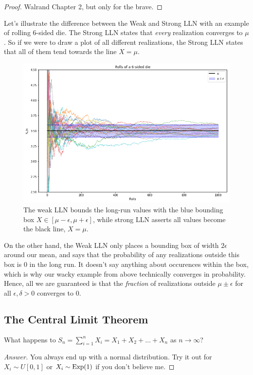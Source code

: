 \documentclass[11 pt]{scrartcl}
\begin{document}
\begin{proof}
    Walrand Chapter 2, but only for the brave. 
\end{proof}

Let's illustrate the difference between the Weak and Strong LLN with an example of rolling 6-sided die. The Strong LLN states that \emph{every} realization converges to $\mu$. So if we were to draw a plot of all different realizations, the Strong LLN states that all of them tend towards the line $X = \mu$. 

\begin{figure}[!htb]
\centering
    \includegraphics[scale=0.61]{LLN.png}
    \caption{The weak LLN bounds the long-run values with the blue bounding box $X \in [\mu-\epsilon, \mu + \epsilon]$, while strong LLN asserts all values become the black line, $X = \mu$.}
\end{figure}

On the other hand, the Weak LLN only places a bounding box of width $2\epsilon$ around our mean, and says that the probability of any realizations outside this box is 0 in the long run. It doesn't say anything about occurences within the box, which is why our wacky example from above technically converges in probability. Hence, all we are guaranteed is that the \emph{fraction} of realizations outside $\mu\pm \epsilon$ for all $\epsilon, \delta > 0$ converges to $0$. 

\subsection{The Central Limit Theorem}

\begin{question}
    What happens to $S_n = \sum_{i = 1}^n X_i = X_1 + X_2 + \dots + X_n$ as $n\to\infty$?
\end{question}
\begin{proof}[Answer]
    You always end up with a normal distribution. Try it out for $X_i \sim U[0,1]$ or $X_i \sim \text{Exp}(1)$ if you don't believe me. 
\end{proof}
\end{document}
